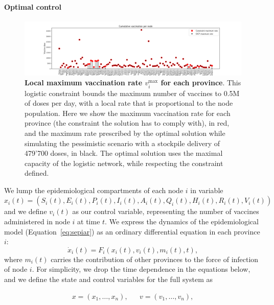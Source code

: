\paragraph{Optimal control}
\begin{figure}[!ht]
    \centering
    \includegraphics[width=1\textwidth]{fig_italy-ocp/figuresSI/SI_constraint_dist.pdf}
    \caption[Local maximum vaccination rate for each province]{\textbf{Local maximum vaccination rate $v_i^\mathrm{max}$ for each province}. This logistic constraint bounds the maximum number of vaccines to 0.5M of doses per day, with a local rate that is proportional to the node population. Here we show the maximum vaccination rate for each province (the constraint the solution has to comply with), in red, and the maximum rate prescribed by the optimal solution while simulating the pessimistic scenario with a stockpile delivery of 479'700 doses, in black. The optimal solution uses the maximal capacity of the logistic network, while respecting the constraint defined.}
    \label{fig:OC_logistic_constraints}
\end{figure}

We lump the epidemiological compartments of each node $i$ in variable $x_i(t)=(S_i(t),E_i(t),P_i(t),I_i(t),A_i(t),Q_i(t),H_i(t),R_i(t),V_i(t))$ and we define $v_i(t)$ as our control variable, representing the number of vaccines administered in node $i$ at time $t$. We express the dynamics of the epidemiological model (Equation~\eqref{eq:sepiar}) as an ordinary differential equation in each province $i$:
\begin{equation}
    \label{eq:sepiar_compact}
    \dot x_i(t) = F_i(x_i(t),v_i(t), m_i(t), t),
\end{equation}
where $m_i(t)$ carries the contribution of other provinces to the force of infection of node $i$. For simplicity, we drop the time dependence in the equations below, and we define the state and control variables for the full system as

\begin{align*}
    x = (x_1,\ldots,x_n), && v = (v_1,\ldots,v_n),
\end{align*}

